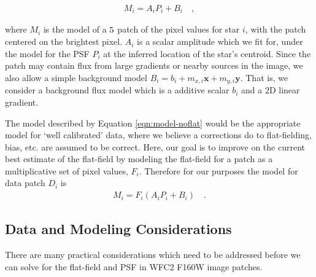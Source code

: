 \documentclass[12pt,preprint,pdftex]{aastex}
\newcommand{\vc}[1]{\mathbf{#1}}
\begin{document}
\begin{eqnarray}
M_i = A_i P_i + B_i
\quad , 
\label{eqn:model-noflat}
\end{eqnarray}

\noindent where $M_i$ is the model of  a $5\time5$ patch of the pixel values for star $i$, with the patch 
centered on the brightest pixel.  $A_i$ is a scalar amplitude which we fit for, under the model 
for the PSF $P_i$ at the inferred location of the star's centroid.  Since the patch may contain flux from 
large gradients or nearby sources in the image, we also allow a simple background model 
$B_i = b_i + m_{x, i} \vc{x} + m_{y, i} \vc{y}$.  That is, we consider a background flux model 
which is a additive scalar $b_i$ and a 2D linear gradient.  

The model described by Equation \ref{eqn:model-noflat} would be the appropriate model for 
`well calibrated' data, where we believe a corrections do to flat-fielding, bias, etc. are assumed 
to be correct.  Here, our goal is to improve on the current best estimate of the flat-field by modeling 
the flat-field for a patch as a multiplicative set of pixel values, $F_i$.  Therefore for our purposes 
the model for data patch $D_i$ is 
\begin{eqnarray}
M_i = F_i (A_i P_i + B_i)
\quad .
\label{eqn:model-noflat}
\end{eqnarray}

\subsection{Data and Modeling Considerations}

There are many practical considerations which need to be addressed before we can solve 
for the flat-field and PSF in WFC2 F160W image patches.  
\end{document}
